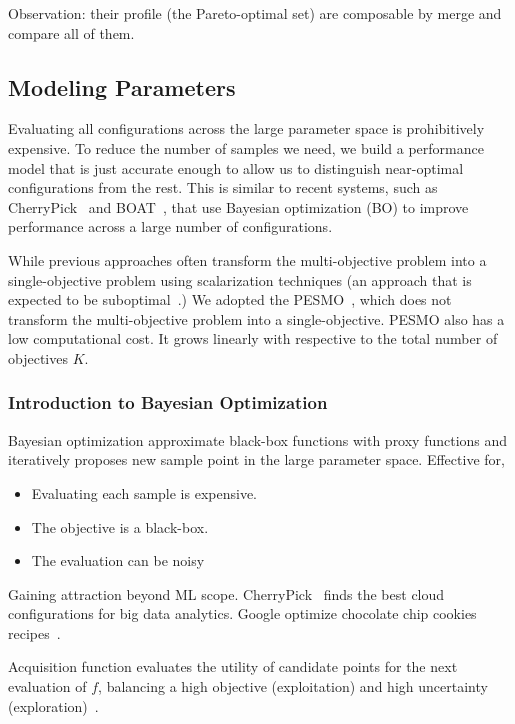 Observation: their profile (the Pareto-optimal set) are composable by merge and
compare all of them.

\subsection{Modeling Parameters}
\label{sec:single-platform}

Evaluating all configurations across the large parameter space is prohibitively
expensive. To reduce the number of samples we need, we build a performance model
that is just accurate enough to allow us to distinguish near-optimal
configurations from the rest. This is similar to recent systems, such as
CherryPick~\cite{alipourfard2017cherrypick} and BOAT~\cite{dalibard2017boat},
that use Bayesian optimization (BO) to improve performance across a large number
of configurations.

While previous approaches often transform the multi-objective problem into a
single-objective problem using scalarization techniques (an approach that is
expected to be suboptimal~\cite{knowles2006parego}.) We adopted the
PESMO~\cite{hernandez2016predictive}, which does not transform the
multi-objective problem into a single-objective. PESMO also has a low
computational cost. It grows linearly with respective to the total number of
objectives $K$.

\subsubsection{Introduction to Bayesian Optimization}
\label{sec:bo}

Bayesian optimization approximate black-box functions with proxy functions and
iteratively proposes new sample point in the large parameter space. Effective
for,

\begin{itemize}
\item Evaluating each sample is expensive.
\item The objective is a black-box.
\item The evaluation can be noisy
\end{itemize}

Gaining attraction beyond ML scope. CherryPick~\cite{alipourfard2017cherrypick}
finds the best cloud configurations for big data analytics. Google optimize
chocolate chip cookies recipes~\cite{solnik2017bayesian}.

Acquisition function evaluates the utility of candidate points for the next
evaluation of $f$, balancing a high objective (exploitation) and high
uncertainty (exploration)~\cite{shahriari2016taking}.

